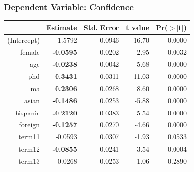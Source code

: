 \documentclass[11pt]{article} %
\begin{document}
\subsubsection{Dependent Variable: Confidence}


\begin{table}[H]
\centering
% 
\begin{tabular}{rrrrr}
  \hline
 & Estimate & Std. Error & t value & Pr($>$$|$t$|$) \\ 
  \hline
(Intercept) & 1.5792 & 0.0946 & 16.70 & 0.0000 \\ 
  female &\textbf{ -0.0595} & 0.0202 & -2.95 & 0.0032 \\ 
  age & \textbf{-0.0238} & 0.0042 & -5.68 & 0.0000 \\ 
  phd & \textbf{0.3431} & 0.0311 & 11.03 & 0.0000 \\ 
  ma & \textbf{0.2306} & 0.0268 & 8.60 & 0.0000 \\ 
  asian & \textbf{-0.1486} & 0.0253 & -5.88 & 0.0000 \\ 
  hispanic & \textbf{-0.2120} & 0.0383 & -5.54 & 0.0000 \\ 
  foreign &\textbf{ -0.1257} & 0.0270 & -4.66 & 0.0000 \\ 
  term11 & -0.0593 & 0.0307 & -1.93 & 0.0533 \\ 
  term12 &\textbf{ -0.0855} & 0.0241 & -3.54 & 0.0004 \\ 
  term13 & 0.0268 & 0.0253 & 1.06 & 0.2890 \\ 
   \hline
\end{tabular}
\end{table}
\end{document}
